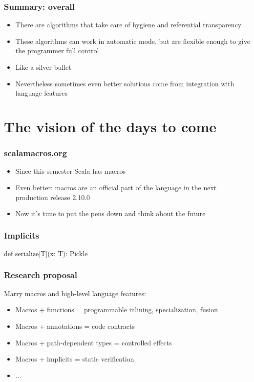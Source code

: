 \documentclass[hyperref={bookmarks=false}]{beamer}
\begin{document}
\begin{frame}[fragile]
\frametitle{Summary: overall}
\begin{itemize}
\item There are algorithms that take care of hygiene and referential transparency
\item These algorithms can work in automatic mode, but are flexible enough to give the programmer full control
\item Like a silver bullet
\item Nevertheless sometimes even better solutions come from integration with language features
\end{itemize}
\end{frame}

\section{The vision of the days to come}

\begin{frame}[fragile]
\frametitle{scalamacros.org}
\begin{itemize}
\item Since this semester Scala has macros
\item Even better: macros are an official part of the language in the next production release 2.10.0
\item Now it's time to put the pens down and think about the future
\end{itemize}
\end{frame}

\begin{frame}[fragile]
\frametitle{Implicits}
\begin{semiverbatim}
def serialize[T](x: T): Pickle

\end{semiverbatim}
\end{frame}

\begin{frame}[fragile]
\frametitle{Research proposal}

Marry macros and high-level language features:

\begin{itemize}
\item Macros + functions = programmable inlining, specialization, fusion
\item Macros + annotations = code contracts
\item Macros + path-dependent types = controlled effects
\item Macros + implicits = static verification
\item ...
\end{itemize}
\end{frame}
\end{document}
